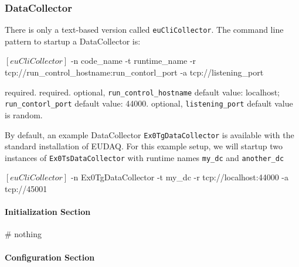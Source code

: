 \subsubsection{DataCollector}
\label{sec:datacollector}
There is only a text-based version called \texttt{euCliCollector}.
The command line pattern to startup a DataCollector is:
\begin{listing}[mybash]
$[euCliCollector]$ -n {code_name} -t {runtime_name} -r tcp://{run_control_hostname}:{run_contorl_port} -a tcp://{listening_port}
\end{listing}

\begin{description}
required.
required.
optional, \texttt{run\_control\_hostname} default value: localhost;  \texttt{run\_contorl\_port}  default value: 44000.
optional, \texttt{listening\_port} default value is random.
\end{description}

By default, an example DataCollector \texttt{Ex0TgDataCollector} is available with the standard installation of EUDAQ.
For this example setup, we will startup two instances of \texttt{Ex0TsDataCollector} with runtime names \texttt{my\_dc} and \texttt{another\_dc}\\
\begin{listing}[mybash]
$[euCliCollector]$ -n Ex0TgDataCollector -t my_dc -r tcp://localhost:44000 -a tcp://45001
\end{listing}

\paragraph{Initialization Section}
\begin{listing}[conf]
[DataCollector.my_dc]
# nothing
\end{listing}

\paragraph{Configuration Section}

